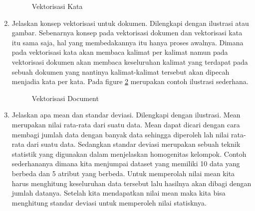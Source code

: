 \begin{enumerate}
	\begin{figure}[ht]
		\caption{Vektorisasi Kata}
		\label{YNC5-2}
	\end{figure}

\item Jelaskan konsep vektorisasi untuk dokumen. Dilengkapi dengan ilustrasi atau gambar.
	\subitem Sebenarnya konsep pada vektorisasi dokumen dan vektorisasi kata itu sama saja, hal yang membedakannya itu hanya proses awalnya. Dimana pada vektorisasi kata akan membaca kalimat per kalimat namun pada vektorisasi dokumen akan membaca keseluruhan kalimat yang terdapat pada sebuah dokumen yang nantinya kalimat-kalimat tersebut akan dipecah menjadia kata per kata. Pada figure \ref{YNC5-3} merupakan contoh ilustrasi sederhana.

	\begin{figure}[ht]
		\caption{Vektorisasi Document}
		\label{YNC5-3}
	\end{figure}

\item Jelaskan apa mean dan standar deviasi. Dilengkapi dengan ilustrasi.
	\subitem Mean merupakan nilai rata-rata dari suatu data. Mean dapat dicari dengan cara membagi jumlah data dengan banyak data sehingga diperoleh lah nilai rata-rata dari suatu data. Sedangkan standar deviasi merupakan sebuah teknik statistik yang digunakan dalam menjelaskan homogenitas kelompok. Contoh sederhananya dimana kita menjumpai dataset yang memiliki 10 data yang berbeda dan 5 atribut yang berbeda. Untuk memperolah nilai mean kita harus menghitung keseluruhan data tersebut lalu hasilnya akan dibagi dengan jumlah datanya. Setelah kita mendapatkan nilai mean maka kita bisa menghitung standar deviasi untuk memperoleh nilai statisknya.


\end{enumerate}
